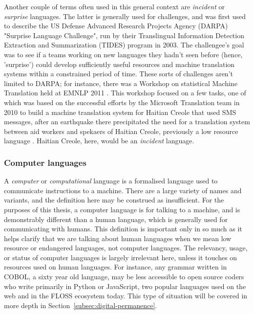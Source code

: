 Another couple of terms often used in this general context are \textit{incident} or \textit{surprise} languages. The latter is generally used for challenges, and was first used to describe the US Defense Advanced Research Projects Agency (DARPA) "Surprise Language Challenge", run by their Translingual Information Detection Extraction and Summarization (TIDES) program in 2003. The challengee's goal was to see if a teams working on new languages they hadn't seen before (hence, 'surprise') could develop sufficiently useful resources and machine translation systems within a constrained period of time. \citep{oard2003surprise} These sorts of challenges aren't limited to DARPA; for instance, there was a Workshop on statistical Machine Translation held  at  EMNLP  2011 \citep{callison2011findings}. This workshop focused on a few tasks, one of which was based on the successful efforts by the Microsoft Translation team in 2010 to build a machine translation system for Haitian Creole that used SMS messages, after an earthquake there precipitated the need for a translation system between aid workers and spekaers of Haitian Creole, previously a low resource language \citep{lewis2010haitian, lewis2011crisis}. Haitian Creole, here, would be an \textit{incident} language.

\subsubsection{Computer languages}

A \textit{computer} or \textit{computational} language is a formalised language used to communicate instructions to a machine. There are a large variety of names and variants, and the definition here may be construed as insufficient. For the purposes of this thesis, a computer language is for talking to a machine, and is demonstrably different than a human language, which is generally used for communicating with humans. This definition is important only in so much as it helps clarify that we are talking about human languages when we mean low resource or endangered languages, not computer languages. The relevancy, usage, or status of computer languages is largely irrelevant here, unless it touches on resources used on human languages. For instance, any grammar written in COBOL, a sixty year old language, may be less accessible to open source coders who write primarily in Python or JavaScript, two popular languages used on the web and in the FLOSS ecosystem today. This type of situation will be covered in more depth in Section~\ref{subsec:digital-permanence}.

